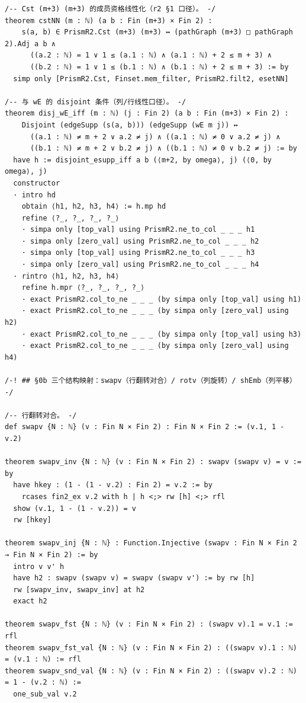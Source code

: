 \documentclass[11pt]{article}
\begin{document}
\begin{lstlisting}
/-- Cst (m+3) (m+3) 的成员资格线性化（r2 §1 口径）。 -/
theorem cstNN (m : ℕ) (a b : Fin (m+3) × Fin 2) :
    s(a, b) ∈ PrismR2.Cst (m+3) (m+3) ↔ (pathGraph (m+3) □ pathGraph 2).Adj a b ∧
      ((a.2 : ℕ) = 1 ∨ 1 ≤ (a.1 : ℕ) ∧ (a.1 : ℕ) + 2 ≤ m + 3) ∧
      ((b.2 : ℕ) = 1 ∨ 1 ≤ (b.1 : ℕ) ∧ (b.1 : ℕ) + 2 ≤ m + 3) := by
  simp only [PrismR2.Cst, Finset.mem_filter, PrismR2.filt2, esetNN]

/-- 与 wE 的 disjoint 条件（列/行线性口径）。 -/
theorem disj_wE_iff (m : ℕ) (j : Fin 2) (a b : Fin (m+3) × Fin 2) :
    Disjoint (edgeSupp (s(a, b))) (edgeSupp (wE m j)) ↔
      ((a.1 : ℕ) ≠ m + 2 ∨ a.2 ≠ j) ∧ ((a.1 : ℕ) ≠ 0 ∨ a.2 ≠ j) ∧
      ((b.1 : ℕ) ≠ m + 2 ∨ b.2 ≠ j) ∧ ((b.1 : ℕ) ≠ 0 ∨ b.2 ≠ j) := by
  have h := disjoint_esupp_iff a b (⟨m+2, by omega⟩, j) (⟨0, by omega⟩, j)
  constructor
  · intro hd
    obtain ⟨h1, h2, h3, h4⟩ := h.mp hd
    refine ⟨?_, ?_, ?_, ?_⟩
    · simpa only [top_val] using PrismR2.ne_to_col _ _ _ h1
    · simpa only [zero_val] using PrismR2.ne_to_col _ _ _ h2
    · simpa only [top_val] using PrismR2.ne_to_col _ _ _ h3
    · simpa only [zero_val] using PrismR2.ne_to_col _ _ _ h4
  · rintro ⟨h1, h2, h3, h4⟩
    refine h.mpr ⟨?_, ?_, ?_, ?_⟩
    · exact PrismR2.col_to_ne _ _ _ (by simpa only [top_val] using h1)
    · exact PrismR2.col_to_ne _ _ _ (by simpa only [zero_val] using h2)
    · exact PrismR2.col_to_ne _ _ _ (by simpa only [top_val] using h3)
    · exact PrismR2.col_to_ne _ _ _ (by simpa only [zero_val] using h4)

/-! ## §0b 三个结构映射：swapv（行翻转对合）/ rotv（列旋转）/ shEmb（列平移） -/

/-- 行翻转对合。 -/
def swapv {N : ℕ} (v : Fin N × Fin 2) : Fin N × Fin 2 := (v.1, 1 - v.2)

theorem swapv_inv {N : ℕ} (v : Fin N × Fin 2) : swapv (swapv v) = v := by
  have hkey : (1 - (1 - v.2) : Fin 2) = v.2 := by
    rcases fin2_ex v.2 with h | h <;> rw [h] <;> rfl
  show (v.1, 1 - (1 - v.2)) = v
  rw [hkey]

theorem swapv_inj {N : ℕ} : Function.Injective (swapv : Fin N × Fin 2 → Fin N × Fin 2) := by
  intro v v' h
  have h2 : swapv (swapv v) = swapv (swapv v') := by rw [h]
  rw [swapv_inv, swapv_inv] at h2
  exact h2

theorem swapv_fst {N : ℕ} (v : Fin N × Fin 2) : (swapv v).1 = v.1 := rfl
theorem swapv_fst_val {N : ℕ} (v : Fin N × Fin 2) : ((swapv v).1 : ℕ) = (v.1 : ℕ) := rfl
theorem swapv_snd_val {N : ℕ} (v : Fin N × Fin 2) : ((swapv v).2 : ℕ) = 1 - (v.2 : ℕ) :=
  one_sub_val v.2


\end{lstlisting}
\end{document}
